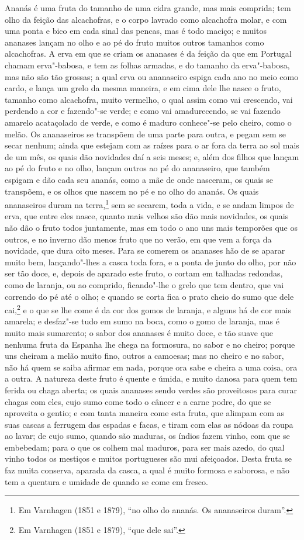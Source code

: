 Ananás é uma fruta do tamanho de uma cidra grande, mas mais comprida; tem olho da feição
das alcachofras, e o corpo lavrado como alcachofra molar, e com uma ponta e bico em cada
sinal das pencas, mas é todo maciço; e muitos ananases lançam no olho e ao pé do fruto
muitos outros tamanhos como alcachofras. A erva em que se criam os ananases é da feição da
que em Portugal chamam erva"-babosa, e tem as folhas armadas, e do tamanho da erva"-babosa,
mas não são tão grossas; a qual erva ou ananaseiro espiga cada ano no meio como cardo, e
lança um grelo da mesma maneira, e em cima dele lhe nasce o fruto, tamanho como
alcachofra, muito vermelho, o qual assim como vai crescendo, vai perdendo a cor e
fazendo"-se verde; e como vai amadurecendo, se vai fazendo amarelo acataçolado de verde, e
como é maduro conhece"-se pelo cheiro, como o melão. Os ananaseiros se transpõem de uma
parte para outra, e pegam sem se secar nenhum; ainda que estejam com as raízes para o ar
fora da terra ao sol mais de um mês, os quais dão novidades daí a seis meses; e, além dos
filhos que lançam ao pé do fruto e no olho, lançam outros ao pé do ananaseiro, que também
espigam e dão cada seu ananás, como a mãe de onde nasceram, os quais se transpõem, e os
olhos que nascem no pé e no olho do ananás. Os quais ananaseiros duram na terra,\footnote{
Em Varnhagen (1851 e 1879), ``no olho do ananás. Os ananaseiros duram''.} sem se secarem,
toda a vida, e se andam limpos de erva, que entre eles nasce, quanto mais velhos são dão
mais novidades, os quais não dão o fruto todos juntamente, mas em todo o ano uns mais
temporões que os outros, e no inverno dão menos fruto que no verão, em que vem a força da
novidade, que dura oito meses. Para se comerem os ananases hão de se aparar muito bem,
lançando"-lhes a casca toda fora, e a ponta de junto do olho, por não ser tão doce, e,
depois de aparado este fruto, o cortam em talhadas redondas, como de laranja, ou ao
comprido, ficando"-lhe o grelo que tem dentro, que vai correndo do pé até o olho; e quando
se corta fica o prato cheio do sumo que dele cai,\footnote{ Em Varnhagen (1851 e 1879),
``que dele sai''.} e o que se lhe come é da cor dos gomos de laranja, e alguns há de cor
mais amarela; e desfaz"-se tudo em sumo na boca, como o gomo de laranja, mas é muito mais
sumarento; o sabor dos ananases é muito doce, e tão suave que nenhuma fruta da Espanha lhe
chega na formosura, no sabor e no cheiro; porque uns cheiram a melão muito fino, outros a
camoesas; mas no cheiro e no sabor, não há quem se saiba afirmar em nada, porque ora sabe
e cheira a uma coisa, ora a outra. A natureza deste fruto é quente e úmida, e muito danosa
para quem tem ferida ou chaga aberta; os quais ananases sendo verdes são proveitosos para
curar chagas com eles, cujo sumo come todo o câncer e a carne podre, do que se aproveita o
gentio; e com tanta maneira come esta fruta, que alimpam com as suas cascas a ferrugem das
espadas e facas, e tiram com elas as nódoas da roupa ao lavar; de cujo sumo, quando são
maduras, os índios fazem vinho, com que se embebedam; para o que os colhem mal maduros,
para ser mais azedo, do qual vinho todos os mestiços e muitos portugueses são mui
afeiçoados. Desta fruta se faz muita conserva, aparada da casca, a qual é muito formosa e
saborosa, e não tem a quentura e umidade de quando se come em fresco.

